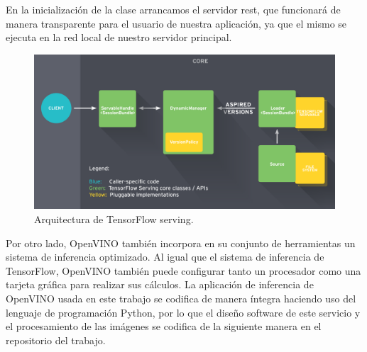 En la inicialización de la clase arrancamos el servidor rest, que funcionará de manera transparente para el usuario de nuestra aplicación, ya que el mismo se ejecuta en la red
local de nuestro servidor principal.


\begin{figure}[h]
    \centering
    \includegraphics[width=1.0\textwidth]{images/chapter3/tf_serving_architecture.png}
    \caption{Arquitectura de TensorFlow serving.}
    \label{fig:Arquitectura de TensorFlow serving}
\end{figure}

Por otro lado, OpenVINO también incorpora en su conjunto de herramientas un sistema de inferencia optimizado.
Al igual que el sistema de inferencia de TensorFlow, OpenVINO también puede configurar tanto un procesador como una tarjeta gráfica para realizar sus cálculos.
La aplicación de inferencia de OpenVINO usada en este trabajo se codifica de manera íntegra haciendo uso del lenguaje de programación Python,
por lo que el diseño software de este servicio y el procesamiento de las imágenes se codifica de la siguiente manera en el repositorio del trabajo.

